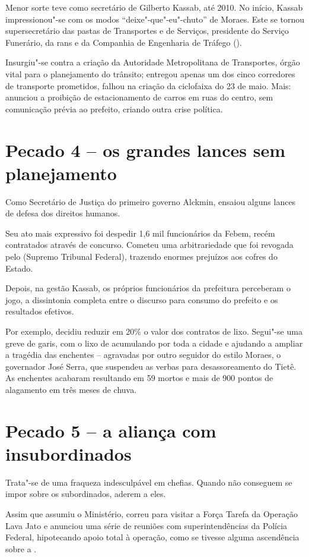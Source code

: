 Menor sorte teve como secretário de Gilberto Kassab, até 2010. No
início, Kassab impressionou"-se com os modos ``deixe"-que"-eu"-chuto'' de
Moraes. Este se tornou supersecretário das pastas de Transportes e de
Serviços, presidente do Serviço Funerário, da rans e da Companhia de
Engenharia de Tráfego ().

Insurgiu"-se contra a criação da Autoridade Metropolitana de Transportes,
órgão vital para o planejamento do trânsito; entregou apenas um dos
cinco corredores de transporte prometidos, falhou na criação da
ciclofaixa do 23 de maio. Mais: anunciou a proibição de estacionamento
de carros em ruas do centro, sem comunicação prévia ao prefeito, criando
outra crise política.

\section{Pecado 4 -- os grandes lances sem planejamento}

Como Secretário de Justiça do primeiro governo Alckmin, ensaiou alguns
lances de defesa dos direitos humanos.

Seu ato mais expressivo foi despedir 1,6 mil funcionários da Febem,
recém contratados através de concurso. Cometeu uma arbitrariedade que
foi revogada pelo  (Supremo Tribunal Federal), trazendo enormes
prejuízos aos cofres do Estado.

Depois, na gestão Kassab, os próprios funcionários da prefeitura
perceberam o jogo, a dissintonia completa entre o discurso para consumo
do prefeito e os resultados efetivos.

Por exemplo, decidiu reduzir em 20\% o valor dos contratos de lixo.
Segui"-se uma greve de garis, com o lixo de acumulando por toda a cidade
e ajudando a ampliar a tragédia das enchentes -- agravadas por outro
seguidor do estilo Moraes, o governador José Serra, que suspendeu as
verbas para desassoreamento do Tietê. As enchentes acabaram resultando
em 59 mortos e mais de 900 pontos de alagamento em três meses de chuva.

\section{Pecado 5 -- a aliança com insubordinados}

Trata"-se de uma fraqueza indesculpável em chefias. Quando não conseguem
se impor sobre os subordinados, aderem a eles.

Assim que assumiu o Ministério, correu para visitar a Força Tarefa da
Operação Lava Jato e anunciou uma série de reuniões com
superintendências da Polícia Federal, hipotecando apoio total à
operação, como se tivesse alguma ascendência sobre a .

